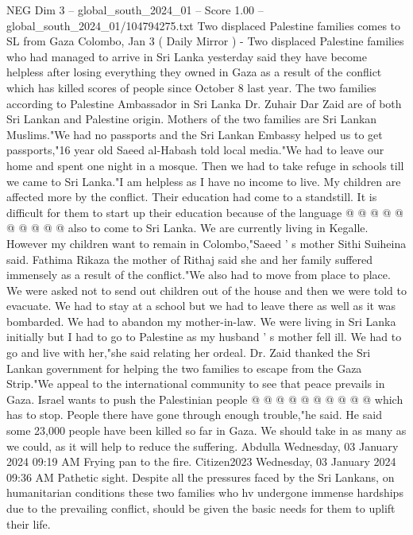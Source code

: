 \begin{textsample}{NEG Dim 3 – global\_south\_2024\_01 – Score 1.00 – global\_south\_2024\_01/104794275.txt}  \label{ex:f3_neg_108}
Two displaced Palestine families comes to SL from Gaza Colombo, Jan 3 ( Daily Mirror ) - Two displaced Palestine families who had managed to arrive in Sri Lanka yesterday said they have become helpless after losing everything they owned in Gaza as a result of the conflict which has killed scores of people since October 8 last year.
The two families according to Palestine Ambassador in Sri Lanka Dr.
Zuhair Dar Zaid are of both Sri Lankan and Palestine origin.
Mothers of the two families are Sri Lankan Muslims."We had no passports and the Sri Lankan Embassy helped us to get passports,"16 year old Saeed al-Habash told local media."We had to leave our home and spent one night in a mosque.
Then we had to take refuge in schools till we came to Sri Lanka."I am helpless as I have no income to live.
My children are affected more by the conflict.
Their education had come to a standstill.
It is difficult for them to start up their education because of the language @ @ @ @ @ @ @ @ @ @ also to come to Sri Lanka.
We are currently living in Kegalle.
However my children want to remain in Colombo,"Saeed ' s mother Sithi Suiheina said.
Fathima Rikaza the mother of Rithaj said she and her family suffered immensely as a result of the conflict."We also had to move from place to place.
We were asked not to send out children out of the house and then we were told to evacuate.
We had to stay at a school but we had to leave there as well as it was bombarded.
We had to abandon my mother-in-law.
We were living in Sri Lanka initially but I had to go to Palestine as my husband ' s mother fell ill.
We had to go and live with her,"she said relating her ordeal.
Dr.
Zaid thanked the Sri Lankan government for helping the two families to escape from the Gaza Strip."We appeal to the international community to see that peace prevails in Gaza.
Israel wants to push the Palestinian people @ @ @ @ @ @ @ @ @ @ which has to stop.
People there have gone through enough trouble,"he said.
He said some 23,000 people have been killed so far in Gaza.
We should take in as many as we could, as it will help to reduce the suffering.
Abdulla Wednesday, 03 January 2024 09:19 AM Frying pan to the fire.
Citizen2023 Wednesday, 03 January 2024 09:36 AM Pathetic sight.
Despite all the pressures faced by the Sri Lankans, on humanitarian conditions these two families who hv undergone immense hardships due to the prevailing conflict, should be given the basic needs for them to uplift their life.

\end{textsample}
